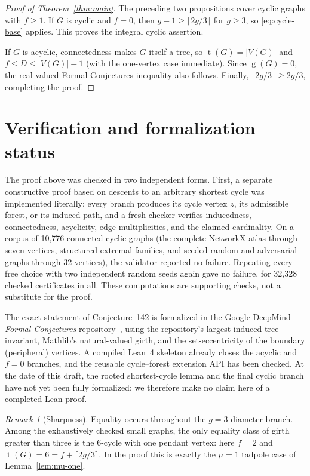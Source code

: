 \documentclass[11pt]{article}
\numberwithin{equation}{section}
\theoremstyle{remark}
\newtheorem{remark}[theorem]{Remark}
\newcommand{\tr}{\operatorname{t}}
\newcommand{\gr}{\operatorname{g}}
\begin{document}
\begin{proof}[Proof of Theorem~\ref{thm:main}]
The preceding two propositions cover cyclic graphs with $f\ge1$.  If $G$ is
cyclic and $f=0$, then $g-1\ge\lceil2g/3\rceil$ for $g\ge3$, so
\eqref{eq:cycle-base} applies.  This proves the integral cyclic assertion.

If $G$ is acyclic, connectedness makes $G$ itself a tree, so
$\tr(G)=|V(G)|$ and $f\le D\le |V(G)|-1$ (with the one-vertex case
immediate).  Since $\gr(G)=0$, the real-valued Formal Conjectures inequality
also follows.  Finally,
$\lceil2g/3\rceil\ge2g/3$, completing the proof.
\end{proof}

\section{Verification and formalization status}\label{sec:verification}

The proof above was checked in two independent forms.  First, a separate
constructive proof based on descents to an arbitrary shortest cycle was
implemented literally: every branch produces its cycle vertex $z$, its
admissible forest, or its induced path, and a fresh checker verifies
inducedness, connectedness, acyclicity, edge multiplicities, and the claimed
cardinality.  On a corpus of 10,776 connected cyclic graphs (the complete
NetworkX atlas through seven vertices, structured extremal families, and
seeded random and adversarial graphs through 32 vertices), the validator
reported no failure.  Repeating every free choice with two independent
random seeds again gave no failure, for 32,328 checked certificates in all.
These computations are supporting checks, not a substitute for the proof.

The exact statement of Conjecture~142 is formalized in the Google DeepMind
\emph{Formal Conjectures} repository~\cite{FC,FC142}, using the repository's
largest-induced-tree invariant, Mathlib's natural-valued girth, and the
set-eccentricity of the boundary (peripheral) vertices.  A compiled Lean~4
skeleton already closes the acyclic and $f=0$ branches, and the reusable
cycle--forest extension API has been checked.  At the date of this draft, the
rooted shortest-cycle lemma and the final cyclic branch have not yet been
fully formalized; we therefore make no claim here of a completed Lean proof.

\begin{remark}[Sharpness]
Equality occurs throughout the $g=3$ diameter branch.  Among the exhaustively
checked small graphs, the only equality class of girth greater than three is
the $6$-cycle with one pendant vertex: here $f=2$ and
$\tr(G)=6=f+\lceil2g/3\rceil$.  In the proof this is exactly the
$\mu=1$ tadpole case of Lemma~\ref{lem:mu-one}.
\end{remark}
\end{document}
